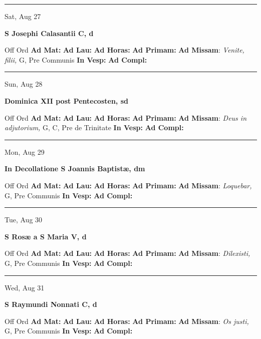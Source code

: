 \documentclass[letterpaper, 10pt]{article}
\begin{document}
\hrule
\begin{center}
Sat, Aug 27
\end{center}\textbf{ \large S Josephi Calasantii C, \textnormal{\normalsize d}}
\begin{justify}
Off Ord
\textbf{Ad Mat: }
\textbf{Ad Lau: }
\textbf{Ad Horas: }
\textbf{Ad Primam: }
\textbf{Ad Missam}: \textit{Venite, filii,} G, Pre Communis
\textbf{In Vesp: }
\textbf{Ad Compl: }\end{justify}



\hrule
\begin{center}
Sun, Aug 28
\end{center}\textbf{ \large Dominica XII post Pentecosten, \textnormal{\normalsize sd}}
\begin{justify}
Off Ord
\textbf{Ad Mat: }
\textbf{Ad Lau: }
\textbf{Ad Horas: }
\textbf{Ad Primam: }
\textbf{Ad Missam}: \textit{Deus in adjutorium,} G, C, Pre de Trinitate
\textbf{In Vesp: }
\textbf{Ad Compl: }\end{justify}



\hrule
\begin{center}
Mon, Aug 29
\end{center}\textbf{ \large In Decollatione S Joannis Baptistæ, \textnormal{\normalsize dm}}
\begin{justify}
Off Ord
\textbf{Ad Mat: }
\textbf{Ad Lau: }
\textbf{Ad Horas: }
\textbf{Ad Primam: }
\textbf{Ad Missam}: \textit{Loquebar,} G, Pre Communis
\textbf{In Vesp: }
\textbf{Ad Compl: }\end{justify}



\hrule
\begin{center}
Tue, Aug 30
\end{center}\textbf{ \large S Rosæ a S Maria V, \textnormal{\normalsize d}}
\begin{justify}
Off Ord
\textbf{Ad Mat: }
\textbf{Ad Lau: }
\textbf{Ad Horas: }
\textbf{Ad Primam: }
\textbf{Ad Missam}: \textit{Dilexisti,} G, Pre Communis
\textbf{In Vesp: }
\textbf{Ad Compl: }\end{justify}



\hrule
\begin{center}
Wed, Aug 31
\end{center}\textbf{ \large S Raymundi Nonnati C, \textnormal{\normalsize d}}
\begin{justify}
Off Ord
\textbf{Ad Mat: }
\textbf{Ad Lau: }
\textbf{Ad Horas: }
\textbf{Ad Primam: }
\textbf{Ad Missam}: \textit{Os justi,} G, Pre Communis
\textbf{In Vesp: }
\textbf{Ad Compl: }\end{justify}
\end{document}
